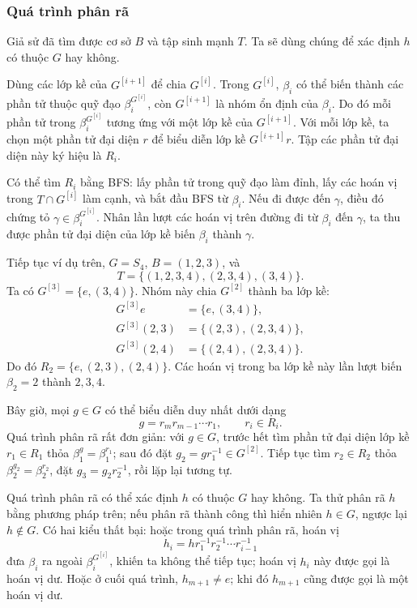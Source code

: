 \documentclass[11pt]{article}
\begin{document}
\subsubsection{Quá trình phân rã}

Giả sử đã tìm được cơ sở \(B\) và tập sinh mạnh \(T\). Ta sẽ dùng chúng để xác
định \(h\) có thuộc \(G\) hay không.

Dùng các lớp kề của \(G^{[i+1]}\) để chia \(G^{[i]}\). Trong \(G^{[i]}\),
\(\beta_i\) có thể biến thành các phần tử thuộc quỹ đạo
\(\beta_i^{G^{[i]}}\), còn \(G^{[i+1]}\) là nhóm ổn định của \(\beta_i\). Do đó
mỗi phần tử trong \(\beta_i^{G^{[i]}}\) tương ứng với một lớp kề của
\(G^{[i+1]}\). Với mỗi lớp kề, ta chọn một phần tử đại diện \(r\) để biểu diễn
lớp kề \(G^{[i+1]}r\). Tập các phần tử đại diện này ký hiệu là \(R_i\).

Có thể tìm \(R_i\) bằng BFS: lấy phần tử trong quỹ đạo làm đỉnh, lấy các hoán vị
trong \(T\cap G^{[i]}\) làm cạnh, và bắt đầu BFS từ \(\beta_i\). Nếu đi được
đến \(\gamma\), điều đó chứng tỏ \(\gamma\in\beta_i^{G^{[i]}}\). Nhân lần lượt
các hoán vị trên đường đi từ \(\beta_i\) đến \(\gamma\), ta thu được phần tử
đại diện của lớp kề biến \(\beta_i\) thành \(\gamma\).

Tiếp tục ví dụ trên, \(G=S_4\), \(B=(1,2,3)\), và
\[
  T=\{(1,2,3,4),(2,3,4),(3,4)\}.
\]
Ta có \(G^{[3]}=\{e,(3,4)\}\). Nhóm này chia \(G^{[2]}\) thành ba lớp kề:
\[
\begin{aligned}
G^{[3]}e&=\{e,(3,4)\},\\
G^{[3]}(2,3)&=\{(2,3),(2,3,4)\},\\
G^{[3]}(2,4)&=\{(2,4),(2,3,4)\}.
\end{aligned}
\]
Do đó \(R_2=\{e,(2,3),(2,4)\}\). Các hoán vị trong ba lớp kề này lần lượt biến
\(\beta_2=2\) thành \(2,3,4\).

Bây giờ, mọi \(g\in G\) có thể biểu diễn duy nhất dưới dạng
\[
  g=r_mr_{m-1}\cdots r_1,\qquad r_i\in R_i.
\]
Quá trình phân rã rất đơn giản: với \(g\in G\), trước hết tìm phần tử đại diện
lớp kề \(r_1\in R_1\) thỏa \(\beta_1^g=\beta_1^{r_1}\); sau đó đặt
\(g_2=gr_1^{-1}\in G^{[2]}\). Tiếp tục tìm \(r_2\in R_2\) thỏa
\(\beta_2^{g_2}=\beta_2^{r_2}\), đặt \(g_3=g_2r_2^{-1}\), rồi lặp lại tương tự.

Quá trình phân rã có thể xác định \(h\) có thuộc \(G\) hay không. Ta thử phân
rã \(h\) bằng phương pháp trên; nếu phân rã thành công thì hiển nhiên
\(h\in G\), ngược lại \(h\notin G\). Có hai kiểu thất bại: hoặc trong quá trình
phân rã, hoán vị
\[
  h_i=hr_1^{-1}r_2^{-1}\cdots r_{i-1}^{-1}
\]
đưa \(\beta_i\) ra ngoài \(\beta_i^{G^{[i]}}\), khiến ta không thể tiếp tục;
hoán vị \(h_i\) này được gọi là hoán vị dư. Hoặc ở cuối quá trình,
\(h_{m+1}\ne e\); khi đó \(h_{m+1}\) cũng được gọi là một hoán vị dư.
\end{document}
